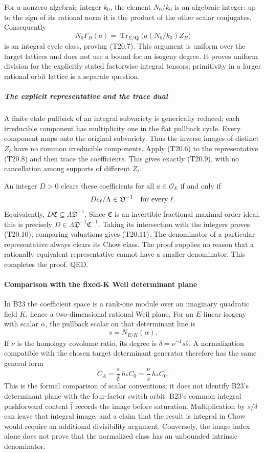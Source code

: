 \documentclass[11pt,a4paper]{article}
\theoremstyle{definition}
\begin{document}
For a nonzero algebraic integer \(k_0\), the element \(N_0/k_0\) is an algebraic integer: up to the sign of its rational norm it is the product of the other scalar conjugates. Consequently \[
 N_0\Gamma_B(a)
   =\operatorname{Tr}_{E/\mathbf Q}
       \bigl(a(N_0/k_0)Z_B\bigr)
\] is an integral cycle class, proving (T20.7). This argument is uniform over the target lattices and does not use a bound for an isogeny degree. It proves uniform division for the explicitly stated factorwise integral tensors; primitivity in a larger rational orbit lattice is a separate question.

\subparagraph{The explicit representative and the trace dual}\label{the-explicit-representative-and-the-trace-dual}

A finite etale pullback of an integral subvariety is generically reduced; each irreducible component has multiplicity one in the flat pullback cycle. Every component maps onto the original subvariety. Thus the inverse images of distinct \(Z_\ell\) have no common irreducible components. Apply (T20.6) to the representative (T20.8) and then trace the coefficients. This gives exactly (T20.9), with no cancellation among supports of different \(Z_\ell\).

An integer \(D>0\) clears these coefficients for all \(a\in\mathcal O_E\) if and only if \[
 D c_\ell/\Lambda\in\mathfrak D^{-1}
 \quad\hbox{for every }\ell.
\] Equivalently, \(D\mathfrak C\subseteq\Lambda\mathfrak D^{-1}\). Since \(\mathfrak C\) is an invertible fractional maximal-order ideal, this is precisely \(D\in\Lambda\mathfrak D^{-1}\mathfrak C^{-1}\). Taking its intersection with the integers proves (T20.10); comparing valuations gives (T20.11). The denominator of a particular representative always clears its Chow class. The proof supplies no reason that a rationally equivalent representative cannot have a smaller denominator. This completes the proof. QED.

\paragraph{Comparison with the fixed-K Weil determinant plane}\label{comparison-with-the-fixed-k-weil-determinant-plane}

In B23 the coefficient space is a rank-one module over an imaginary quadratic field \(K\), hence a two-dimensional rational Weil plane. For an \(E\)-linear isogeny with scalar \(\alpha\), the pullback scalar on that determinant line is \[
 s=N_{E/K}(\alpha).
\] If \(\nu\) is the homology covolume ratio, its degree is \(\delta=\nu^{-1}s\bar s\). A normalization compatible with the chosen target determinant generator therefore has the same general form \[
 C_A=\frac{s}{\delta}\,h_*C_0
     =\frac{\nu}{\bar s}\,h_*C_0.
 \tag{T20.14}
\] This is the formal comparison of scalar conventions; it does not identify B23's determinant plane with the four-factor switch orbit. B23's common integral pushforward content \(\bar{\mathfrak j}\) records the image before saturation. Multiplication by \(s/\delta\) can leave that integral image, and a claim that the result is integral in Chow would require an additional divisibility argument. Conversely, the image index alone does not prove that the normalized class has an unbounded intrinsic denominator.
\end{document}
